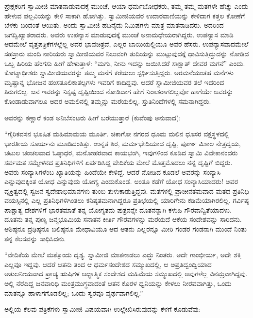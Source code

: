 ಪ್ರೇಕ್ಷಕರಿಗೆ ಸ್ವಾಮೀಜಿ ಮಾತನಾಡುವುದಕ್ಕೆ ಮುಂಚೆ, ಆಯಾ ಧರ್ಮಬೋಧಕರು, ತಮ್ಮ ತಮ್ಮ ಮತಗಳೇ ಹೆಚ್ಚು ಎಂದು ಹೇಳುವ ಪಲ್ಲವಿಯನ್ನು ಕೇಳಿ ಸಾಕಾಗಿ ಹೋಗಿತ್ತು. ಸ್ವಾಮೀಜಿಯವರ ಉದಾರವಾಣಿಯನ್ನು ಕೇಳಿದಾಗ ಕತ್ತಲ ಕೋಣೆಗೆ ಬೆಳಕು ಬಂದಂತೆ ಆಯಿತು. ಅಂದು ಸ್ವಾಮೀಜಿ ಹದಿನೈದು ನಿಮಿಷಗಳು ಮಾತ್ರ ಮಾತನಾಡಿದರು. ಅದರಿಂದ ಜಗದ್ವಿಖ್ಯಾತರಾದರು. ಅವರು ಉಪನ್ಯಾಸ ಮಾಡುವುದಕ್ಕೆ ಮುಂಚೆ ಅನಾಮಧೇಯರಾಗಿದ್ದರು. ಉಪನ್ಯಾಸ ಮಾಡಿ ಆದಮೇಲೆ ವೃತ್ತಪತ್ರಿಕೆಗಳಲ್ಲೆಲ್ಲ ಅವರ ಭಾವಚಿತ್ರವೆ, ಎಲ್ಲರ ಬಾಯಿಯಲ್ಲಿಯೂ ಅವರ ಹೆಸರು. ಉಪನ್ಯಾಸವಾದಮೇಲೆ ಸಹಸ್ರಾರು ಮಂದಿ ನಾರಿಯರು ಸ್ವಾಮೀಜಿಯವರ ನಿಲುವಂಗಿ ತುದಿಯನ್ನು ಮುಟ್ಟುವುದಕ್ಕೆ ಧಾವಿಸುತ್ತಿದ್ದುದನ್ನು ನೋಡಿದ ಒಬ್ಬ ಹಿರಿಯ ಹೆಂಗಸು ಹೀಗೆ ಹೇಳುತ್ತಾಳೆ: “ಮಗು, ನೀನು ಇದನ್ನು ಜಯಿಸಿದರೆ ಸಾಕ್ಷಾತ್ ದೇವರ ಮಗನೆ” ಎಂದು. ಕೋಟ್ಯಾಧೀಶರು ಸ್ವಾಮೀಜಿಯವರನ್ನು ತಮ್ಮ ಮನೆಗೆ ಕರೆಯಲು ಸ್ಪರ್ಧಿಸುತ್ತಿದ್ದರು. ಅರಮನೆಯಂತಹ ಮನೆಗಳು ಮೃಷ್ಟಾನ್ನ ಭೋಜನ ಹಂಸತೂಲಿಕಾತಲ್ಪಗಳು ಇವರಿಗೆ ಕಾದಿದ್ದವು. ಆದರೆ ಸ್ವಾಮೀಜಿಯವರ ತಲೆ ಇದರಿಂದ ತಿರುಗಲಿಲ್ಲ. ಜನ ಇವರನ್ನು ನಿಕೃಷ್ಟ ದೃಷ್ಟಿಯಿಂದ ನೋಡಿದಾಗ ಹೇಗೆ ನಿರಾಶರಾಗಲಿಲ್ಲವೋ ಹಾಗೆಯೇ ಅವರನ್ನು ಕೊಂಡಾಡುವಾಗಲೂ ಅದರ ಅಮಲಿನಲ್ಲಿ ತಮ್ಮನ್ನು ಮರೆಯಲಿಲ್ಲ. ಸ್ತುತಿನಿಂದೆಗಳಲ್ಲಿ ಸಮನಾಗಿದ್ದರು. 

 ಅವರನ್ನು ಕಣ್ಣಾರೆ ಕಂಡ ಅನಿಬೆಸಂಟರು ಹೀಗೆ ಬರೆಯುತ್ತಾರೆ (ಕುವೆಂಪು ಅನುವಾದ): 

 “ಗೈರಿಕವಸನ ಭೂಷಿತ ಮಹಿಮಾಮಯ ಮೂರ್ತಿ. ಚಿಕಾಗೋ ನಗರದ ಧೂಮ ಮಲಿನ ಧೂಸರ ವಕ್ಷಸ್ಥಳದಲ್ಲಿ ಭಾರತೀಯ ಸೂರ್ಯನು ಮೂಡಿದಂತಿತ್ತು. ಉನ್ನತ ಶಿರ, ಮರ್ಮಭೇದಿಯಾದ ದೃಷ್ಟಿ, ಪೂರ್ಣ ವಿಶಾಲ ನೇತ್ರದ್ವಯ, ಚಟುಲ ಚಂಚಲವಾದ ಓಷ್ಠಾಧರ, ಮನೋಹರವಾದ ಕಾಯಭಂಗಿ, ಇವುಗಳಿಂದ ಕೂಡಿದ ಸ್ವಾಮಿ ವಿವೇಕಾನಂದರು ಸರ್ವಮತ ಸಮ್ಮೇಳನದ ಪ್ರತಿನಿಧಿಗಳಿಗೆ ಏರ್ಪಡಿಸಿದ್ದ ವೇದಿಕೆಯ ಮೇಲೆ ಮೊತ್ತಮೊದಲು ನನ್ನ ದೃಷ್ಟಿಗೆ ಬಿದ್ದರು. ಅವರು ಸಂನ್ಯಾಸಿಗಳೆಂಬ ಖ್ಯಾತಿಯನ್ನು ಹಿಂದೆಯೇ ಕೇಳಿದ್ದೆ. ಆದರೆ ನೋಡಿದ ಕೂಡಲೆ ಅವರನ್ನು ಸಂನ್ಯಾಸಿ ಎನ್ನುವುದಕ್ಕಿಂತ ಯೋಧ ಎನ್ನುವುದು ಯೋಗ್ಯ ಎಂದುಕೊಂಡೆ. ಅಂತೂ ಕಡೆಗೆ ಯೋಧ ಸಂನ್ಯಾಸಿಯಾದರು! ಅವರ ವ್ಯಕ್ತಿತ್ವದಲ್ಲಿ ಸ್ವಜನ ಸ್ವದೇಶಾಭಿಮಾನಗಳು ತುಂಬಿ ತುಳುಕಾಡುತ್ತಿದ್ದವು. ಮತಗಳಲ್ಲಿ ಪ್ರಾಚೀನತಮವಾದ ಮತದ ಪ್ರತಿನಿಧಿ ವಯಸ್ಸಿನಲ್ಲಿ ಎಲ್ಲ ಪ್ರತಿನಿಧಿಗಳಿಗಿಂತಲು ಕನಿಷ್ಠತಮನಾಗಿದ್ದರೂ ಪ್ರತಿಭೆಯಲ್ಲಿ ಯಾರಿಗೇನು ಕಡಿಮೆಯಾಗಿರಲಿಲ್ಲ. ಗರ್ವಿಷ್ಠ ಪಾಶ್ಚಾತ್ಯ ದೇಶಗಳಿಗೆ ಭಾರತಮಾತೆ ತನ್ನ ಯೋಗ್ಯತಮ ಪುತ್ರನನ್ನೇ ದೂತನನ್ನಾಗಿ ಕಳುಹಿ ಗೌರವಾನ್ವಿತೆಯಾದಳು. ದೂತನು ತನ್ನ ಪುಣ್ಯ ಜನ್ಮಭೂಮಿಯ ಸನಾತನ ಕೀರ್ತಿ ಗೌರವಗಳನ್ನು ಮರೆಯದೆ ಆಕೆಯ ಸಂದೇಶವನ್ನು ಸಾರಿದನು. ಆಶಿಷ್ಠನೂ ದ್ರಢಿಷ್ಠನೂ ಬಲಿಷ್ಠನೂ ಮೇಧಾವಿಯೂ ಆದ ಆತನು ಎಲ್ಲರನ್ನೂ ಮೀರಿ ಗಂಡರ ಗಂಡನಾಗಿ ಮುಂದೆ ನಿಂತು ತನ್ನ ಕೆಲಸವನ್ನು ಸಾಧಿಸಿದನು.

“ವೇದಿಕೆಯ ಮೇಲೆ ಮತ್ತೊಂದು ದೃಶ್ಯ. ಸ್ವಾಮೀಜಿ ಮಾತನಾಡಲು ಎದ್ದು ನಿಂತರು. ಅದೇ ಗಾಂಭೀರ್ಯ, ಅದೇ ಶಕ್ತಿ ಎಲ್ಲವೂ ಇದ್ದವು. ಆದರೆ ಆತನು ತಂದ ಆ ಧರ್ಮಸಂದೇಶದ ಸಮ್ಮುಖದಲ್ಲಿ, ಆ ಅಪ್ರತಿದ್ವಂದ್ವಿಯಾದ ಅತುಲನೀಯವಾದ ಪ್ರಾಚ್ಯ ಋಷಿಗಳ ಆಧ್ಯಾತ್ಮಿಕ ಸಂದೇಶದ ಮಹಿಮೆಯ ಸಮ್ಮುಖದಲ್ಲಿ ಅವುಗಳೆಲ್ಲ ವಿನಮ್ರವಾಗಿದ್ದವು. ಅಲ್ಲಿ ನೆರೆದಿದ್ದ ಜನವಾರಿಧಿ ಮಂತ್ರಮುಗ್ಧವಾದಂತೆ ಆತನ ಕೊರಳ ಧ್ವನಿಯನ್ನು ಕೇಳಲು ನೀರವವಾಗಿತ್ತು, ಒಂದು ಮಾತನ್ನೂ ಹಾಳಾಗಗೊಡಲಿಲ್ಲ; ಒಂದು ಸ್ವರವೂ ವ್ಯರ್ಥವಾಗಲಿಲ್ಲ.” 

 ಅಲ್ಲಿಯ ಕೆಲವು ಪತ್ರಿಕೆಗಳು ಸ್ವಾಮೀಜಿ ವಿಷಯವಾಗಿ ಉಲ್ಲೇಖಿಸಿರುವುದನ್ನು ಕೆಳಗೆ ಕೊಡುವೆವು: 

